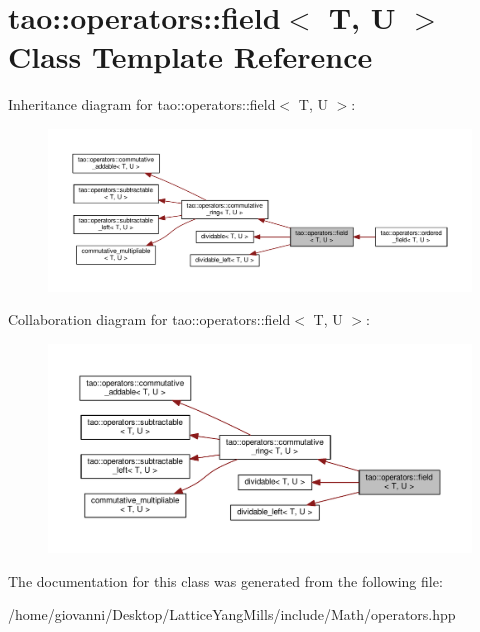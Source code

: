 \hypertarget{classtao_1_1operators_1_1field}{}\section{tao\+:\+:operators\+:\+:field$<$ T, U $>$ Class Template Reference}
\label{classtao_1_1operators_1_1field}


Inheritance diagram for tao\+:\+:operators\+:\+:field$<$ T, U $>$\+:\nopagebreak
\begin{figure}[H]
\begin{center}
\leavevmode
\includegraphics[width=350pt]{classtao_1_1operators_1_1field__inherit__graph}
\end{center}
\end{figure}


Collaboration diagram for tao\+:\+:operators\+:\+:field$<$ T, U $>$\+:\nopagebreak
\begin{figure}[H]
\begin{center}
\leavevmode
\includegraphics[width=350pt]{classtao_1_1operators_1_1field__coll__graph}
\end{center}
\end{figure}


The documentation for this class was generated from the following file\+:\begin{DoxyCompactItemize}
\item 
/home/giovanni/\+Desktop/\+Lattice\+Yang\+Mills/include/\+Math/operators.\+hpp\end{DoxyCompactItemize}
